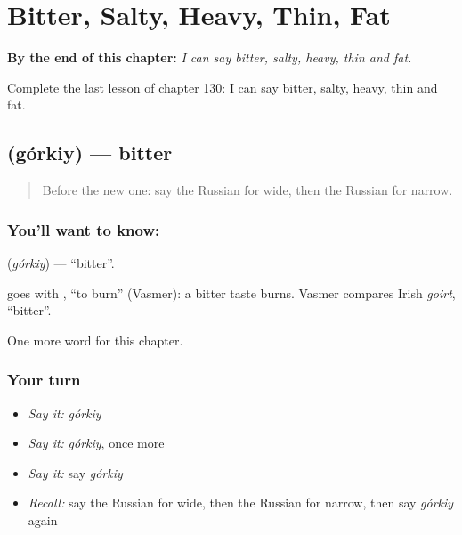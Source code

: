 
\chapter{Bitter, Salty, Heavy, Thin, Fat}
\label{ch:ru-bitter-salty-heavy-thin-fat}

\begin{chapteropening}
\textbf{By the end of this chapter:} \emph{I can say bitter, salty, heavy, thin and fat.}

Complete the last lesson of chapter 130: I can say bitter, salty, heavy, thin and fat.
\end{chapteropening}

\section[\texorpdfstring{\ru{горький} (górkiy)}{горький (górkiy)}]{ (górkiy) — bitter}

\label{lesson:RU-C130-bitter}



\begin{quote}
Before the new one: say the Russian for wide, then the Russian for narrow.
\end{quote}

\subsection*{You'll want to know: }
\textbf{} (\emph{górkiy}) — \textquotedblleft{}bitter\textquotedblright{}.

\begin{cousinweb}
\textbf{} goes with \emph{}, \textquotedblleft{}to burn\textquotedblright{} (Vasmer): a bitter taste burns. Vasmer compares Irish \emph{goirt}, \textquotedblleft{}bitter\textquotedblright{}.
\end{cousinweb}

\begin{grammarlens}[title={What you've built}]
One more word for this chapter.
\end{grammarlens}

\subsection*{Your turn}
\begin{itemize}
\raggedright
  \item \emph{Say it:} \emph{górkiy}
  \item \emph{Say it:} \emph{górkiy}, once more
  \item \emph{Say it:} say \emph{górkiy}
  \item \emph{Recall:} say the Russian for wide, then the Russian for narrow, then say \emph{górkiy} again
\end{itemize}

